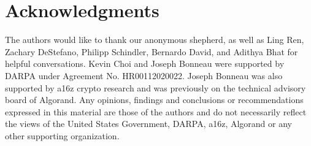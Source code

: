 \section*{Acknowledgments}

The authors would like to thank our anonymous shepherd, as well as Ling Ren, Zachary DeStefano, Philipp Schindler, Bernardo David, and Adithya Bhat for helpful conversations.
Kevin Choi and Joseph Bonneau were supported by DARPA under Agreement No. HR00112020022.
Joseph Bonneau was also supported by a16z crypto research and was previously on the technical advisory board of Algorand.
Any opinions, findings and conclusions or recommendations expressed in this material are those of the authors and do not necessarily reflect the views of the United States Government, DARPA, a16z, Algorand or any other supporting organization.
